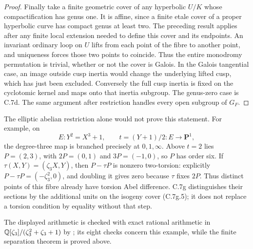 \begin{proof}
Finally take a finite geometric cover of any hyperbolic $U/K$
whose compactification has genus one. It is affine, since a finite
etale cover of a proper hyperbolic curve has compact genus at least
two. The preceding result applies after any finite local extension
needed to define this cover and its endpoints. An invariant ordinary
loop on $U$ lifts from each point of the fibre to another point,
and uniqueness forces those two points to coincide. Thus the
entire monodromy permutation is trivial, whether or not the cover
is Galois. In the Galois tangential case, an image outside cusp
inertia would change the underlying lifted cusp, which has just
been excluded. Conversely the full cusp inertia is fixed on the
cyclotomic kernel and maps onto that inertia subgroup. The genus-zero
case is C.7d. The same argument after restriction handles every
open subgroup of $G_F$.
\end{proof}

The elliptic abelian restriction alone would not prove this statement.
For example, on
\[
       E:Y^2=X^3+1,\qquad t=(Y+1)/2:E\longrightarrow\mathbf P^1,
\]
the degree-three map is branched precisely at $0,1,\infty$.
Above $t=2$ lies $P=(2,3)$, with
$2P=(0,1)$ and $3P=(-1,0)$, so $P$ has order six.
If $\tau(X,Y)=(\zeta_3X,Y)$, then $P-\tau P$ is nonzero
two-torsion: explicitly $P-\tau P=(-\zeta_3^2,0)$, and doubling
it gives zero because $\tau$ fixes $2P$.
Thus distinct points of this fibre already have torsion Abel
difference. C.7g distinguishes their sections by the additional
units on the isogeny cover (C.7g.5); it does not replace a torsion
condition by equality without that step.

The displayed arithmetic is checked with exact rational arithmetic in
$\mathbb Q[\zeta_3]/(\zeta_3^2+\zeta_3+1)$ by
; its eight checks concern
this example, while the finite separation theorem is proved above.
